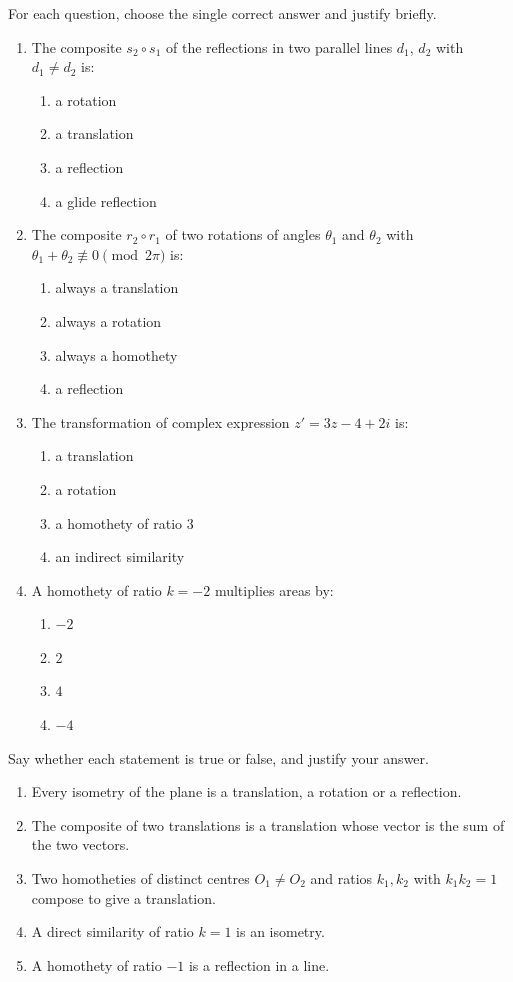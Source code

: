 \documentclass[11pt]{article}
\begin{document}
\begin{exercice}
For each question, choose the single correct answer and justify briefly.
\begin{enumerate}
\item The composite $s_2 \circ s_1$ of the reflections in two parallel lines $d_1$, $d_2$ with $d_1 \neq d_2$ is:
\begin{enumerate}
\item a rotation \item a translation \item a reflection \item a glide reflection
\end{enumerate}
\item The composite $r_2 \circ r_1$ of two rotations of angles $\theta_1$ and $\theta_2$ with $\theta_1 + \theta_2 \not\equiv 0 \pmod{2\pi}$ is:
\begin{enumerate}
\item always a translation \item always a rotation \item always a homothety \item a reflection
\end{enumerate}
\item The transformation of complex expression $z' = 3z - 4 + 2i$ is:
\begin{enumerate}
\item a translation \item a rotation \item a homothety of ratio $3$ \item an indirect similarity
\end{enumerate}
\item A homothety of ratio $k = -2$ multiplies areas by:
\begin{enumerate}
\item $-2$ \item $2$ \item $4$ \item $-4$
\end{enumerate}
\end{enumerate}
\end{exercice}

\begin{exercice}
Say whether each statement is true or false, and justify your answer.
\begin{enumerate}
\item Every isometry of the plane is a translation, a rotation or a reflection.
\item The composite of two translations is a translation whose vector is the sum of the two vectors.
\item Two homotheties of distinct centres $O_1 \neq O_2$ and ratios $k_1, k_2$ with $k_1 k_2 = 1$ compose to give a translation.
\item A direct similarity of ratio $k = 1$ is an isometry.
\item A homothety of ratio $-1$ is a reflection in a line.
\end{enumerate}
\end{exercice}
\end{document}
